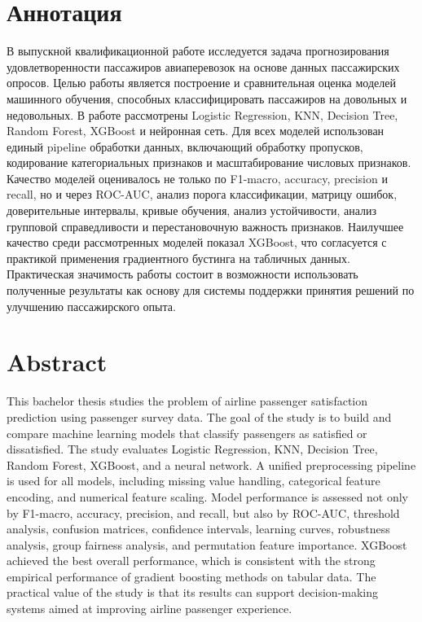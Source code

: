 \documentclass[14pt,a4paper]{extreport}
\begin{document}
\chapter*{Аннотация}
В выпускной квалификационной работе исследуется задача прогнозирования удовлетворенности пассажиров авиаперевозок на основе данных пассажирских опросов. Целью работы является построение и сравнительная оценка моделей машинного обучения, способных классифицировать пассажиров на довольных и недовольных. В работе рассмотрены Logistic Regression, KNN, Decision Tree, Random Forest, XGBoost и нейронная сеть. Для всех моделей использован единый pipeline обработки данных, включающий обработку пропусков, кодирование категориальных признаков и масштабирование числовых признаков. Качество моделей оценивалось не только по F1-macro, accuracy, precision и recall, но и через ROC-AUC, анализ порога классификации, матрицу ошибок, доверительные интервалы, кривые обучения, анализ устойчивости, анализ групповой справедливости и перестановочную важность признаков. Наилучшее качество среди рассмотренных моделей показал XGBoost, что согласуется с практикой применения градиентного бустинга на табличных данных. Практическая значимость работы состоит в возможности использовать полученные результаты как основу для системы поддержки принятия решений по улучшению пассажирского опыта.

\chapter*{Abstract}
This bachelor thesis studies the problem of airline passenger satisfaction prediction using passenger survey data. The goal of the study is to build and compare machine learning models that classify passengers as satisfied or dissatisfied. The study evaluates Logistic Regression, KNN, Decision Tree, Random Forest, XGBoost, and a neural network. A unified preprocessing pipeline is used for all models, including missing value handling, categorical feature encoding, and numerical feature scaling. Model performance is assessed not only by F1-macro, accuracy, precision, and recall, but also by ROC-AUC, threshold analysis, confusion matrices, confidence intervals, learning curves, robustness analysis, group fairness analysis, and permutation feature importance. XGBoost achieved the best overall performance, which is consistent with the strong empirical performance of gradient boosting methods on tabular data. The practical value of the study is that its results can support decision-making systems aimed at improving airline passenger experience.
\end{document}
